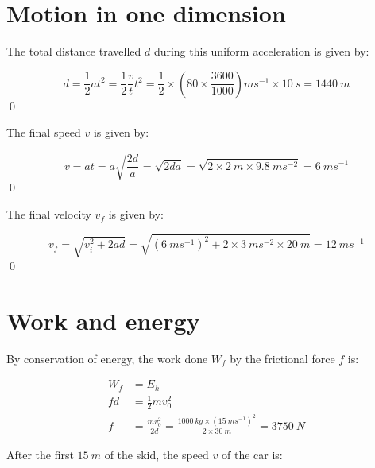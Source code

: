 \documentclass[12pt]{article}
\begin{document}



\pagebreak
\section*{Motion in one dimension}


The total distance travelled $d$ during this uniform acceleration is given by:

\begin{equation}
    d = \frac{1}{2} a t^{2} = \frac{1}{2} \frac{v}{t} t^{2} = \frac{1}{2} \times \left( 80 \times \frac{3600}{1000} \right) \unit{ms^{-1}} \times \qty{10}{s} = \boxed{\qty{1440}{m}}
\end{equation}
\qed


The final speed $v$ is given by:

\begin{equation}
    v = a t = a \sqrt{\frac{2d}{a}} = \sqrt{2d a} = \sqrt{2 \times \qty{2}{m} \times \qty{9.8}{ms^{-2}}} = \boxed{\qty{6}{ms^{-1}}}
\end{equation}
\qed


The final velocity $v_{f}$ is given by:

\begin{equation}
    v_{f} = \sqrt{v_{i}^2 + 2ad} = \sqrt{(\qty{6}{ms^{-1}})^{2} + 2 \times \qty{3}{ms^{-2}} \times \qty{20}{m}} = \boxed{\qty{12}{ms^{-1}}}
\end{equation}
\qed


\pagebreak
\section*{Work and energy}


By conservation of energy, the work done $W_{f}$ by the frictional force $f$ is:

\begin{equation}
\begin{split}
    W_{f} &= E_{k} \\
    f d &= \frac{1}{2} m v_{0}^{2} \\
    f &= \frac{m v_{0}^{2}}{2d} = \frac{\qty{1000}{kg} \times (\qty{15}{ms^{-1}})^{2}}{2 \times \qty{30}{m}} = \boxed{\qty{3750}{N}}
\end{split}
\end{equation}

After the first $\qty{15}{m}$ of the skid, the speed $v$ of the car is:
\end{document}
